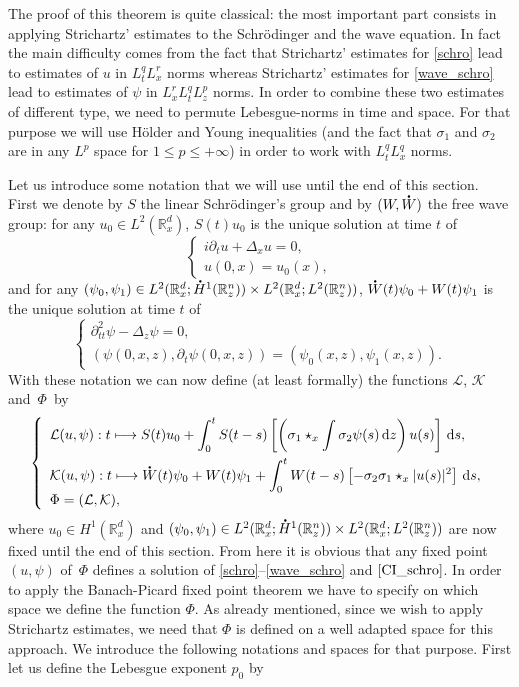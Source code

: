 \documentclass[10pt]{amsart}
\theoremstyle{definition}
\newcommand*{\overbigdot}[1]{%
\accentset{\mbox{\large\bfseries .}}{#1}}
\newcommand{\R}{\mathbb{R}}
\let\ds\displaystyle
\newcommand{\ud}{\, {\mathrm{d}}}
\begin{document}
The proof of this theorem is quite classical: the most important part consists in applying Strichartz' estimates to the Schrödinger and the wave equation. In fact the main difficulty comes from the fact that Strichartz' estimates for \eqref{schro} lead to estimates of $u$ in $L_{t}^{q}L_{x}^{r}$ norms whereas Strichartz' estimates for \eqref{wave_schro} lead to estimates of $\psi$ in $L_{x}^{r}L_{t}^{q}L_{z}^{p}$ norms. In order to combine these two estimates
of different type,
we need to permute Lebesgue-norms in time and space. For that purpose we will use Hölder and Young inequalities (and the fact that $\sigma_{1}$ and $\sigma_{2}$ are in any $L^{p}$ space for $1\leq p\leq+\infty$) in order to work with $L_{t}^{q}L_{x}^{q}$ norms.

Let us introduce some notation that we will use until the end of this section. First we denote by $S$ the linear Schrödinger's group and by $(W,\overbigdot{W})$ the free wave group: for any $u_{0}\in L^{2}(\R_{x}^{d})$, $S(t)u_{0}$ is the unique solution at time $t$ of
\[
\left\{\begin{array}{l}
\ds i\partial_{t}u+\Delta_{x}u=0,\\
\ds u(0,x)=u_{0}(x),
\end{array}\right.
\]
and for any $(\psi_{0},\psi_{1})\in L^{2}(\R_{x}^{d};\overbigdot{H}^{1}(\R_{z}^{n}))\times L^{2}(\R_{x}^{d};L^{2}(\R_{z}^{n}))$, $\overbigdot{W}(t)\psi_{0}+W(t)\psi_{1}$ is the unique solution at time $t$ of
\[
\left\{\begin{array}{l}
\ds \partial_{tt}^{2}\psi-\Delta_{z}\psi=0,\\[3pt]
\ds (\psi(0,x,z),\partial_{t}\psi(0,x,z))=(\psi_{0}(x,z),\psi_{1}(x,z)).
\end{array}\right.
\]
With these notation we can now define (at least formally) the functions $\mathcal{L}$, $\mathcal{K}$ and~$\Phi$~by
\[
\left\{\begin{array}{l}
\ds \mathcal{L}(u,\psi):t\longmapsto S(t)u_{0}+\int_{0}^{t}S(t-s)\left[\left(\sigma_{1}\star_{x}\int\sigma_{2}\psi(s)\ud z\right)u(s)\right]\ud s,\\[10pt]
\ds\mathcal{K}(u,\psi):t\longmapsto \overbigdot{W}(t)\psi_{0}+W(t)\psi_{1}+\int_{0}^{t}W(t-s)\left[-\sigma_{2}\sigma_{1}\star_{x}|u(s)|^{2}\right]\ud s,\\
\Phi=(\mathcal{L},\mathcal{K}),
\end{array}\right.
\]
where $u_{0}\in H^{1}(\R_{x}^{d})$ and $(\psi_{0},\psi_{1})\in L^{2}(\R_{x}^{d};\overbigdot{H}^{1}(\R_{z}^{n}))\times L^{2}(\R_{x}^{d};L^{2}(\R_{z}^{n}))$ are now fixed until the end of this section. From here it is obvious that any fixed point $(u,\psi)$ of~$\Phi$ defines a solution of \eqref{schro}--\eqref{wave_schro} and $\eqref{CI_schro}$. In order to apply the Banach-Picard fixed point theorem we have to specify on which space we define the function $\Phi$. As already mentioned, since we wish to apply Strichartz estimates, we need that $\Phi$ is defined on a well adapted space for this approach. We introduce the following notations and spaces for that purpose. First let us define the Lebesgue exponent $p_{0}$ by
\end{document}
